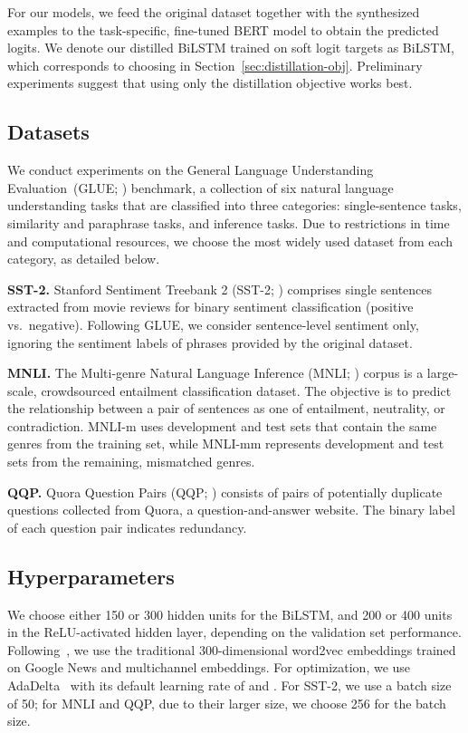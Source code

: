 \documentclass[11pt,a4paper]{article}
\newcommand{\parheader}[1]{{\smallskip \noindent \bf #1.}}
\begin{document}
For our models, we feed the original dataset together with the synthesized examples to the task-specific, fine-tuned BERT model to obtain the predicted logits.
We denote our distilled BiLSTM trained on soft logit targets as BiLSTM, which corresponds to choosing  in Section~\ref{sec:distillation-obj}.
Preliminary experiments suggest that using only the distillation objective works best.


\subsection{Datasets}


We conduct experiments on the General Language Understanding Evaluation~(GLUE; \citealp{wang2018glue}) benchmark, a collection of six natural language understanding tasks that are classified into three categories: single-sentence tasks, similarity and paraphrase tasks, and inference tasks. Due to restrictions in time and computational resources, we choose the most widely used dataset from each category, as detailed below.

\parheader{SST-2}
Stanford Sentiment Treebank 2 (SST-2; \citealp{socher2013recursive}) comprises single sentences extracted from movie reviews for binary sentiment classification (positive vs.~negative). Following GLUE, we consider sentence-level sentiment only, ignoring the sentiment labels of phrases provided by the original dataset.


\parheader{MNLI}
The Multi-genre Natural Language Inference (MNLI; \citealp{williams2017broad}) corpus is a large-scale, crowdsourced entailment classification dataset. 
The objective is to predict the relationship between a pair of sentences as one of entailment, neutrality, or contradiction.
\mbox{MNLI-m} uses development and test sets that contain the same genres from the training set, while \mbox{MNLI-mm} represents development and test sets from the remaining, mismatched genres.

\parheader{QQP}
Quora Question Pairs (QQP; \citealp{qqp}) consists of pairs of potentially duplicate questions collected from Quora, a question-and-answer website. 
The binary label of each question pair indicates redundancy.

\subsection{Hyperparameters}
We choose either 150 or 300 hidden units for the BiLSTM, and 200 or 400 units in the ReLU-activated hidden layer, depending on the validation set performance. Following~\citet{kim2014convolutional}, we use the traditional 300-dimensional word2vec embeddings trained on Google News and multichannel embeddings. For optimization, we use AdaDelta~\cite{zeiler2012adadelta} with its default learning rate of  and .
For SST-2, we use a batch size of 50; for MNLI and QQP, due to their larger size, we choose 256 for the batch size. 
\end{document}
